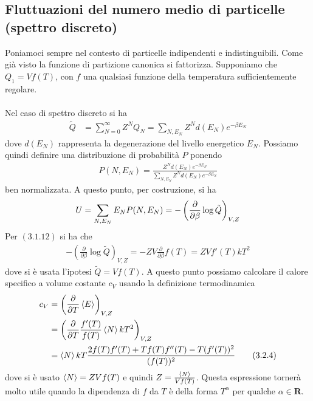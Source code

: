 \documentclass{article}
\begin{document}
\newpage
\subsection{Fluttuazioni del numero medio di particelle (spettro discreto)}
Poniamoci sempre nel contesto di particelle indipendenti e indistinguibili. Come già visto la funzione di partizione canonica si fattorizza. Supponiamo che $Q_1 = Vf(T)$, con $f$ una qualsiasi funzione della temperatura sufficientemente regolare. \\ \\
Nel caso di spettro discreto si ha 
\begin{align}
    \tilde{Q} &= \sum_{N = 0}^\infty Z^NQ_N = \sum_{N, E_N} Z^Nd(E_N)e^{-\beta E_N} \tag{3.2.1}
\end{align}
dove $d(E_N)$ rappresenta la degenerazione del livello energetico $E_N$. Possiamo quindi definire una distribuzione di probabilità $P$ ponendo 
\begin{align}
    P(N, E_N) = \frac{Z^Nd(E_N)e^{-\beta E_N}}{\sum_{N, E_N}Z^Nd(E_N)e^{-\beta E_N}} \tag{3.2.2}
\end{align}
ben normalizzata. A questo punto, per costruzione, si ha 
\begin{align}
    U = \sum_{N, E_N} E_NP(N, E_N) = -\left(\frac{\partial}{\partial\beta}\log \tilde{Q}\right) _{V, Z}\notag
\end{align}
Per $(3.1.12)$ si ha che 
\begin{align}
    -\left(\frac{\partial}{\partial\beta}\log \tilde{Q}\right)_{V, Z} = -ZV\frac{\partial}{\partial\beta}f(T) = ZVf'(T)kT^2 \tag{3.2.3}
\end{align}
dove si è usata l'ipotesi $\tilde{Q} = Vf(T)$. A questo punto possiamo calcolare il calore specifico a volume costante $c_V$ usando la definizione termodinamica 
\begin{align}
    c_V &= \left(\frac{\partial}{\partial T}\braket{E}\right)_{V, Z} \notag \\
    &= \left(\frac{\partial}{\partial T}\frac{f'(T)}{f(T)}\braket{N}kT^2\right)_{V, Z} \notag \\
    &= \braket{N}kT\frac{2f(T)f'(T) + Tf(T)f''(T) - T(f'(T))^2}{(f(T))^2} \tag{3.2.4}
\end{align}
dove si è usato $\braket{N} = ZVf(T)$ e quindi $Z = \frac{\braket{N}}{Vf(T)}$. Questa espressione tornerà molto utile quando la dipendenza di $f$ da $T$ è della forma $T^\alpha$ per qualche $\alpha \in \mathbf{R}$. \\ \\
\end{document}
